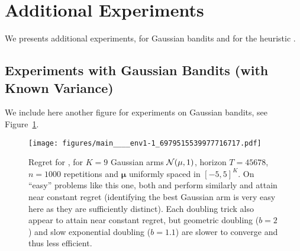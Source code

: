 \documentclass[12pt]{colt2018} %
\begin{document}
\section{Additional Experiments}\label{sec:otherExperiments}

We presents additional experiments, for Gaussian bandits and for the heuristic \DTnr{}.


\subsection{Experiments with Gaussian Bandits (with Known Variance)}\label{sub:experimentsGaussianBandits}

We include here another figure for experiments on Gaussian bandits, see Figure~\ref{fig:gaussianBandits_DoublingTrick_Restart_fixedProblem2}.

%
%
\begin{figure}[!h]
    \centering
    \texttt{[image: figures/main\_\_\_\_env1-1\_6979515539977716717.pdf]}
    \caption{Regret for \DT, for $K=9$ Gaussian arms $\mathcal{N}(\mu, 1)$, horizon $T=45678$, $n=1000$ repetitions and $\boldsymbol{\mu}$ uniformly spaced in $[-5,5]^K$. On ``easy'' problems like this one, both \UCB{} and \AFHG{} perform similarly and attain near constant regret (identifying the best Gaussian arm is very easy here as they are sufficiently distinct). Each doubling trick also appear to attain near constant regret, but geometric doubling ($b=2$) and slow exponential doubling ($b=1.1$) are slower to converge and thus less efficient.}
    \label{fig:gaussianBandits_DoublingTrick_Restart_fixedProblem2}
\end{figure}

\end{document}

